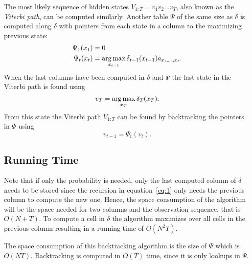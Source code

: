 The most likely sequence of hidden states $V_{1:T} = v_1v_2\dots{}v_T$,
also known as the \emph{Viterbi path}, can be computed similarly. Another table
$\Psi$ of the same size as $\delta$ is computed along $\delta$ with pointers
from each state in a column to the maximizing previous state:
\begin{equation*}
  \begin{aligned}
    \Psi_1(x_1) &= 0 \\
    \Psi_t(x_t) &= \operatorname*{arg\,max}_{x_{t - 1}} \delta_{t - 1}(x_{t - 1}) a_{x_{t - 1}, x_t}.
  \end{aligned}
\end{equation*}
When the last columns have been computed in $\delta$ and $\Psi$ the last state
in the Viterbi path is found using
\begin{equation*}
  v_T = \operatorname*{arg\,max}_{x_T} \delta_T(x_T).
\end{equation*}
From this state the Viterbi path $V_{1:T}$ can be found by backtracking
the pointers in $\Psi$ using
\begin{equation*}
  v_{t-1} = \Psi_{t}(v_{t}).
\end{equation*}

\subsection{Running Time}

Note that if only the probability is needed, only the last computed column of
$\delta$ needs to be stored since the recursion in equation~\eqref{eq:1} only
needs the previous column to compute the new one. Hence, the space consumption
of the algorithm will be the space needed for two columns and the observation
sequence, that is $O(N + T)$. To compute a cell in $\delta$ the algorithm
maximizes over all cells in the previous column resulting in a running time of
$O(N^2 T)$.

The space consumption of this backtracking algorithm is the size of $\Psi$
which is $O(N T)$. Backtracking is computed in $O(T)$ time, since it is only
lookups in $\Psi$.


